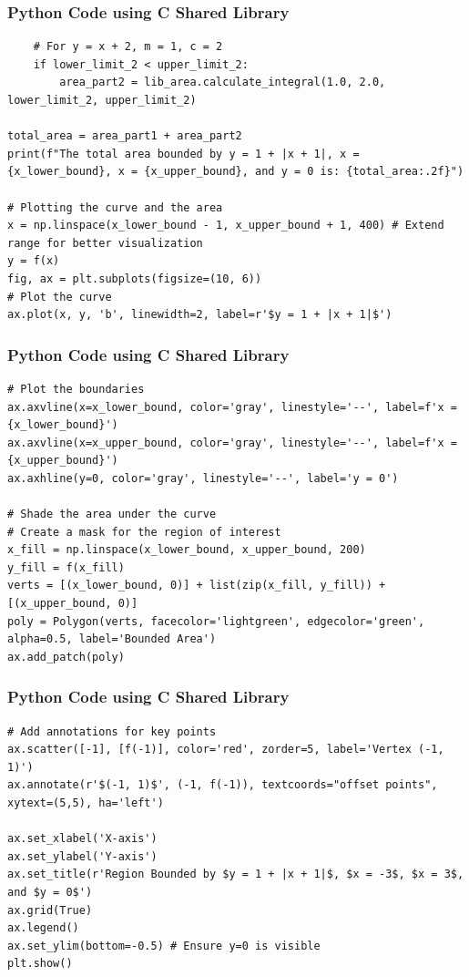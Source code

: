 \documentclass{beamer}
\begin{document}
\begin{frame}[fragile]
\frametitle{Python Code using C Shared Library}
\begin{lstlisting}
    # For y = x + 2, m = 1, c = 2
    if lower_limit_2 < upper_limit_2:
        area_part2 = lib_area.calculate_integral(1.0, 2.0, lower_limit_2, upper_limit_2)

total_area = area_part1 + area_part2
print(f"The total area bounded by y = 1 + |x + 1|, x = {x_lower_bound}, x = {x_upper_bound}, and y = 0 is: {total_area:.2f}")

# Plotting the curve and the area
x = np.linspace(x_lower_bound - 1, x_upper_bound + 1, 400) # Extend range for better visualization
y = f(x)
fig, ax = plt.subplots(figsize=(10, 6))
# Plot the curve
ax.plot(x, y, 'b', linewidth=2, label=r'$y = 1 + |x + 1|$')
\end{lstlisting}
\end{frame}

\begin{frame}[fragile]
\frametitle{Python Code using C Shared Library}
\begin{lstlisting}
# Plot the boundaries
ax.axvline(x=x_lower_bound, color='gray', linestyle='--', label=f'x = {x_lower_bound}')
ax.axvline(x=x_upper_bound, color='gray', linestyle='--', label=f'x = {x_upper_bound}')
ax.axhline(y=0, color='gray', linestyle='--', label='y = 0')

# Shade the area under the curve
# Create a mask for the region of interest
x_fill = np.linspace(x_lower_bound, x_upper_bound, 200)
y_fill = f(x_fill)
verts = [(x_lower_bound, 0)] + list(zip(x_fill, y_fill)) + [(x_upper_bound, 0)]
poly = Polygon(verts, facecolor='lightgreen', edgecolor='green', alpha=0.5, label='Bounded Area')
ax.add_patch(poly)
\end{lstlisting}
\end{frame}

\begin{frame}[fragile]
\frametitle{Python Code using C Shared Library}
\begin{lstlisting}
# Add annotations for key points
ax.scatter([-1], [f(-1)], color='red', zorder=5, label='Vertex (-1, 1)')
ax.annotate(r'$(-1, 1)$', (-1, f(-1)), textcoords="offset points", xytext=(5,5), ha='left')

ax.set_xlabel('X-axis')
ax.set_ylabel('Y-axis')
ax.set_title(r'Region Bounded by $y = 1 + |x + 1|$, $x = -3$, $x = 3$, and $y = 0$')
ax.grid(True)
ax.legend()
ax.set_ylim(bottom=-0.5) # Ensure y=0 is visible
plt.show()
\end{lstlisting}
\end{frame}
\end{document}
